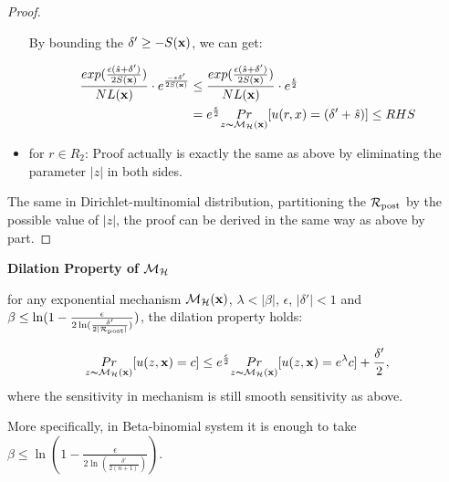 \documentclass{article}
\begin{document}
\begin{proof}
\begin{itemize}
		By bounding the $\delta' \geq -S(\textbf{x})$, we can get:

		\begin{equation*}
		\begin{split}
		\frac{exp(\frac{\epsilon (\hat{s} + \delta')}{2 S(\textbf{x})})}{NL(\textbf{x})} \cdot e^{\frac{- \epsilon \delta'}{2 S(\textbf{x})}}
		& \leq \frac{exp(\frac{\epsilon (\hat{s} + \delta')}{2 S(\textbf{x})})}{NL(\textbf{x})} \cdot e^{\frac{\epsilon}{2}}\\
		&  =  e^{\frac{\epsilon}{2}} \underset{z \thicksim \mathcal{M}_{\mathcal{H}}(\textbf{x})}{Pr}[u(r,x) = (\delta' + \hat{s})] \leq RHS\\
		\end{split}
		\end{equation*}
	\item for $r \in R_2$: Proof actually is exactly the same as above by eliminating the parameter $|z|$ in both sides.
\end{itemize}

The same in Dirichlet-multinomial distribution, partitioning the $\mathcal{R}_{\textup{post}}$ by the possible value of $|z|$, the proof can be derived in the same way as above by part.

\end{proof}



\noindent \textbf{Dilation Property of $\mathcal{M}_{\mathcal{H}}$}
\begin{lem}
\label{lem_dilation}
for any exponential mechanism $\mathcal{M}_{\mathcal{H}}(\textbf{x})$, $\lambda < |\beta|$, $\epsilon$, $|\delta'| < 1$ and $\beta \leq \ln(1 - \frac{\epsilon}{2 \ln (\frac{\delta'}{2 |\mathcal{R}_{\textup{post}}|})})$, the dilation property holds:

\begin{equation*}
\underset{z \thicksim \mathcal{M}_{\mathcal{H}}(\textbf{x})}{Pr}[u(z,\textbf{x}) = c]
\leq
e^{\frac{\epsilon}{2}} \underset{z \thicksim \mathcal{M}_{\mathcal{H}}(\textbf{x})}{Pr}[u(z,\textbf{x}) = e^{\lambda} c] + \frac{\delta'}{2},
\end{equation*}
where the sensitivity in mechanism is still smooth sensitivity as above.

More specifically, in Beta-binomial system it is enough to take $\beta \leq \ln(1 - \frac{\epsilon}{2 \ln (\frac{\delta'}{2 (n + 1)})})$.
\end{lem}
\end{document}
